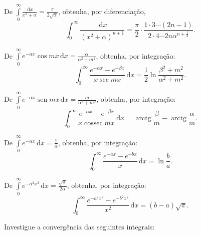 \documentclass[11pt, a5paper]{exam}
\DeclareMathOperator{\sen}{sen}
\DeclareMathOperator{\cossec}{cossec}
\DeclareMathOperator{\arctg}{arctg}
\newcommand{\dd}{\,\mathrm{d}}
\begin{document}
\begin{questions}
\question 
De $ \int\limits_{0}^{\infty} \frac{\dd{x}}{x^2 + \alpha} = \frac{\pi}{2\sqrt{\alpha}} $,
obtenha, por diferenciação,
\[
  \int_{0}^{\infty} \frac{\dd{x}}{(x^2 + \alpha)^{n + 1}} = \frac{\pi}{2} \cdot \frac{1 \cdot 3 \cdots (2n -1)}{2\cdot 4 \cdots 2n \alpha^{n + \frac{1}{2}}}.
\]

\question 
De $ \int\limits_{0}^{\infty} e^{-\alpha x} \cos{mx} \dd{x} = \frac{\alpha}{\alpha^2 + m^2} $,
obtenha, por integração:
\[
  \int_{0}^{\infty} \frac{e^{-\alpha x} - e^{-\beta x}}{x \sec{mx}} \dd{x} = \frac{1}{2} \ln{\frac{\beta^2 + m^2}{\alpha^2 + m^2}}.
\]

\question 
De $ \int\limits_{0}^{\infty} e^{-\alpha x} \sen{mx} \dd{x} = \frac{m}{\alpha^2 + m^2} $,
obtenha, por integração:
\[
  \int_{0}^{\infty} \frac{e^{-\alpha x} - e^{-\beta x}}{x \cossec{mx}} \dd{x} = \arctg{\frac{\beta}{m}} - \arctg{\frac{\alpha}{m}}.
\]

\question
De $ \int\limits_{0}^{\infty} e^{-\alpha x} \dd{x} = \frac{1}{\alpha} $,
obtenha, por integração:
\[
  \int_{0}^{\infty} \frac{e^{-ax} - e^{-bx}}{x} \dd{x} = \ln{\frac{b}{a}}.
\]

\question 
De $ \int\limits_{0}^{\infty} e^{-\alpha^2 x^2} \dd{x} = \frac{\sqrt{\pi}}{2\alpha} $,
obtenha, por integração:
\[
  \int_{0}^{\infty} \frac{e^{-a^2x^2} - e^{-b^2x^2}}{x^2} \dd{x} = (b - a)\sqrt{\pi}.
\]

\question 
Investigue a convergência das seguintes integrais:
\begin{multicols}{2}
\end{multicols}
\end{questions}
\end{document}
